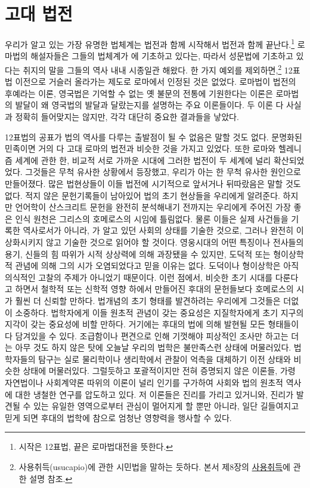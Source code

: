 
\chapter{고대 법전}

우리가 알고 있는 가장 유명한 법체계는 법전과 함께 시작해서
법전과 함께 끝난다.\footnote{시작은 12표법, 끝은 로마법대전을 뜻한다.}
로마법의 해설자들은 그들의 법체계가 에 기초하고 있다는,
따라서 성문법에 기초하고 있다는 취지의 말을 그들의 역사 내내 시종일관 해왔다.
한 가지 예외를 제외하면,\footnote{%
  사용취득(usucapio)에 관한 시민법을 말하는 듯하다.
  본서 제8장의 \hyperlink{usucapio}{사용취득}에 관한 설명 참조.}
12표법 이전으로 거슬러 올라가는 제도로 로마에서 인정된 것은 없었다.
로마법이 법전의 후예라는 이론, 영국법은 기억할 수 없는
옛 불문의 전통에 기원한다는 이론은
로마법의 발달이 왜 영국법의 발달과 달랐는지를 설명하는 주요 이론들이다.
두 이론 다 사실과 정확히 들어맞지는 않지만, 각각 대단히 중요한 결과들을 낳았다.

12표법의 공표가 법의 역사를 다루는 출발점이 될 수 없음은 말할 것도 없다.
문명화된 민족이면 거의 다 고대 로마의 법전과 비슷한 것을 가지고 있었다.
또한 로마와 헬레니즘 세계에 관한 한, 비교적 서로 가까운 시대에
그러한 법전이 두 세계에 널리 확산되었었다.
그것들은 무척 유사한 상황에서 등장했고, 우리가 아는 한
무척 유사한 원인으로 만들어졌다.
많은 법현상들이 이들 법전에 시기적으로 앞서거나 뒤따랐음은 말할 것도 없다.
적지 않은 문헌기록들이 남아있어 법의 초기 현상들을 우리에게 알려준다.
하지만 언어학이 산스크리트 문헌을 완전히 분석해내기 전까지는
우리에게 주어진 가장 좋은 인식 원천은 그리스의 호메로스의 시임에 틀림없다.
물론 이들은 실제 사건들을 기록한 역사로서가 아니라,
가 알고 있던 사회의 상태를 기술한 것으로,
그러나 완전히 이상화시키지 않고 기술한 것으로 읽어야 할 것이다.
영웅시대의 어떤 특징이나 전사들의 용기, 신들의 힘 따위가
시적 상상력에 의해 과장됐을 수 있지만, 도덕적 또는 형이상학적 관념에 의해
그의 시가 오염되었다고 믿을 이유는 없다.
도덕이나 형이상학은 아직 의식적인 고찰의 주제가 아니었기 때문이다.
이런 점에서, 비슷한 초기 시대를 다룬다고 하면서
철학적 또는 신학적 영향 하에서 만들어진 후대의 문헌들보다
호메로스의 시가 훨씬 더 신뢰할 만하다.
법개념의 초기 형태를 발견하려는 우리에게 그것들은 더없이 소중하다.
법학자에게 이들 원초적 관념이 갖는 중요성은
지질학자에게 초기 지구의 지각이 갖는 중요성에 비할 만하다.
거기에는 후대의 법에 의해 발현될 모든 형태들이 다 담겨있을 수 있다.
조급함이나 편견으로 인해 기껏해야 피상적인 조사만 하고는 더는
아무 것도 하지 않은 탓에 오늘날 우리의 법학은 불만족스런 상태에 머물러있다.
법학자들의 탐구는 실로 물리학이나 생리학에서 관찰이 억측을 대체하기 이전
상태와 비슷한 상태에 머물러있다.
그럴듯하고 포괄적이지만 전혀 증명되지 않은 이론들, 가령
자연법이나 사회계약론 따위의 이론이 널리 인기를 구가하여
사회와 법의 원초적 역사에 대한 냉철한 연구를 압도하고 있다.
저 이론들은 진리를 가리고 있거니와,
진리가 발견될 수 있는 유일한 영역으로부터 관심이 멀어지게 할 뿐만 아니라,
일단 길들여지고 믿게 되면 후대의 법학에 참으로 엄청난 영향력을
행사할 수 있다.

